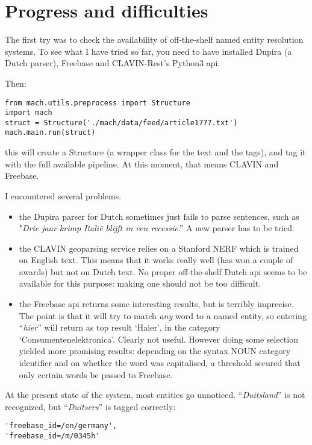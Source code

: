 \documentclass[11pt,leqno,fleqn]{article}
\begin{document}
\section{Progress and difficulties}

The first try was to check the availability of off-the-shelf named entity resolution systems.
To see what I have tried so far, you need to have installed Dupira (a Dutch parser), Freebase and CLAVIN-Rest's Python3 api.

Then:
\lstset{language=Python} 
\begin{lstlisting}
from mach.utils.preprocess import Structure
import mach
struct = Structure('./mach/data/feed/article1777.txt')
mach.main.run(struct)
\end{lstlisting}

this will create a Structure (a wrapper class for the text and the tags), and tag it with the full available pipeline. At this moment, that means CLAVIN and Freebase.

I encountered several problems.
\begin{itemize}
\item the Dupira parser for Dutch sometimes just fails to parse sentences, such as "\emph{Drie jaar krimp Itali\"e blijft in een recessie}.'' A new parser has to be tried.
\item the CLAVIN geoparsing service relies on a Stanford NERF which is trained on English text. This means that it works really well (has won a couple of awards) but not on Dutch text. No proper off-the-shelf Dutch api seems to be available for this purpose: making one should not be too difficult.
\item the Freebase api returns some interesting results, but is terribly imprecise. The point is that it will try to match \emph{any} word to a named entity, so entering ``\emph{hier}'' will return as top result `Haier', in the category `Consumentenelektronica'. Clearly not useful.
However doing some selection yielded more promising results: depending on the syntax NOUN category identifier and on whether the word was capitalised, a threshold secured that only certain words be passed to Freebase.
\end{itemize}

At the present state of the system, most entities go unnoticed. ``\emph{Duitsland}'' is not recognized, but ``\emph{Duitsers}'' is tagged correctly:

\begin{lstlisting}
'freebase_id=/en/germany',
'freebase_id=/m/0345h'
\end{lstlisting}
\end{document}
